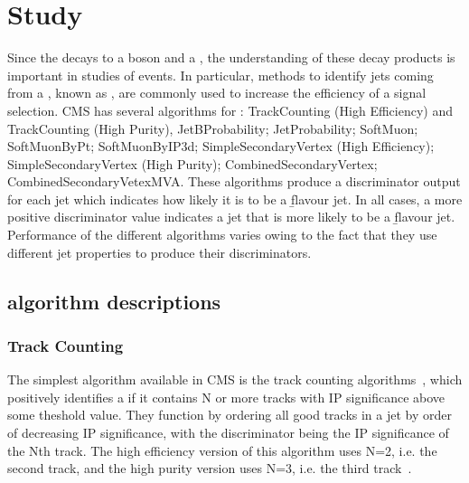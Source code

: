 \chapter{\btagging Study}
\label{c:b_tagging_study}

Since the \tquark decays to a \W boson and a \bquark, the understanding of these decay products is important
in studies of \ttbar events. In particular, methods to identify jets coming from a \bquark, known as
\btagging, are commonly used to increase the efficiency of a signal selection. CMS has several algorithms for
\btagging: TrackCounting (High Efficiency) and TrackCounting (High Purity), JetBProbability; JetProbability;
SoftMuon; SoftMuonByPt; SoftMuonByIP3d; SimpleSecondaryVertex (High Efficiency); SimpleSecondaryVertex (High
Purity); CombinedSecondaryVertex; CombinedSecondaryVetexMVA. These algorithms produce a discriminator output
for each jet which indicates how likely it is to be a \b flavour jet. In all cases, a more positive
discriminator value indicates a jet that is more likely to be a \b flavour jet. Performance of the different
algorithms varies owing to the fact that they use different jet properties to produce their discriminators.


\section{\btagging algorithm descriptions}
\label{s:btagging_algorithm_descriptions}

\subsection*{Track Counting}
\label{ss:track_counting}
The simplest \btagging algorithm available in CMS is the track counting algorithms~\cite{CMS-PAS-BTV-09-001},
which positively identifies a \bjet if it contains N or more tracks with IP significance above some theshold
value. They function by ordering all good tracks in a jet by order of decreasing IP significance, with the
discriminator being the IP significance of the Nth track. The high efficiency version of this algorithm uses
N=2, i.e. the second track, and the high purity version uses N=3, i.e. the third track~\cite{CMS-AN-2005-041}.

